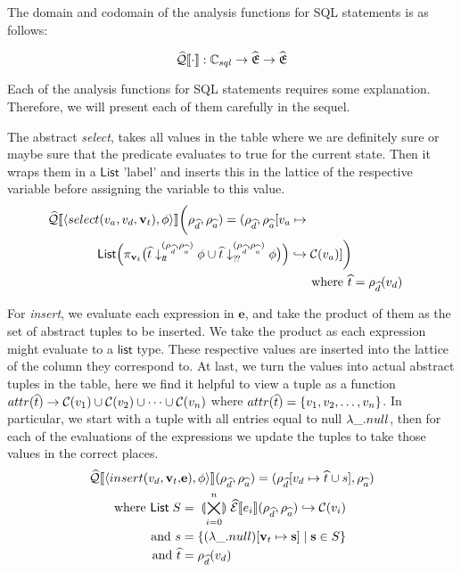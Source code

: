 The domain and codomain of the analysis functions for SQL statements is as follows:

\begin{equation}
    \widehat{\mathcal{Q}}\llbracket \cdot \rrbracket : \mathbb{C}_{sql} \rightarrow \widehat{\mathfrak{E}} \rightarrow \widehat{\mathfrak{E}}
\end{equation}

Each of the analysis functions for SQL statements requires some explanation.
Therefore, we will present each of them carefully in the sequel.

The abstract \textit{select}, takes all values in the table where we are definitely sure or maybe sure that the predicate evaluates to true for the current state.
Then it wraps them in a $\mathsf{List}$ 'label' and inserts this in the lattice of the respective variable before assigning the variable to this value.
\begin{align}
\begin{split}
    \widehat{\mathcal{Q}}\llbracket \langle select(v_a, v_d, \mathbf{v}_t), \phi \rangle \rrbracket\biggl(\rho_{\widehat{d}}, \rho_{\widehat{a}})
    &= (\rho_{\widehat{d}}, \rho_{\widehat{a}}[v_a \mapsto \\
    \mathsf{List} \Bigl( \pi_{\mathbf{v}_t} \bigl(\widehat{t} \downarrow_{t\!t}^{(\rho_{\widehat{d}}, \rho_{\widehat{a}})} \phi \cup \widehat{t} &\downarrow_{?\!?}^{(\rho_{\widehat{d}}, \rho_{\widehat{a}})} \phi \bigr) \Bigr) \hookrightarrow \mathcal{C}(v_a) ]\biggr)
\end{split}\\
    \text{where } \widehat{t}&=\rho_{\widehat{d}}(v_d)
\end{align}

For \textit{insert}, we evaluate each expression in $\mathbf{e}$, and take the product of them as the set of abstract tuples to be inserted.
We take the product as each expression might evaluate to a $\mathsf{list}$ type.
These respective values are inserted into the lattice of the column they correspond to.
At last, we turn the values into actual abstract tuples in the table, here we find it helpful to view a tuple as a function $attr(\widehat{t}) \rightarrow \mathcal{C}(v_1) \cup \mathcal{C}(v_2) \cup \dots \cup \mathcal{C}(v_n)$ where $attr(\widehat{t}) = \{v_1, v_2, \dots, v_n\}$.
In particular, we start with a tuple with all entries equal to null $\lambda\_.null$, then for each of the evaluations of the expressions we update the tuples to take those values in the correct places.
\begin{align}
    \widehat{\mathcal{Q}}\llbracket \langle insert(v_d, \mathbf{v}_t, &\mathbf{e}), \phi \rangle \rrbracket(\rho_{\widehat{d}}, \rho_{\widehat{a}}) = (\rho_{\widehat{d}}[v_d\mapsto \widehat{t}\cup s], \rho_{\widehat{a}}) \\
    \text{where } \mathsf{List} \; S &= \;\llparenthesis\bigtimes_{i = 0}^{n}\rrparenthesis\; \widehat{\mathcal{E}}\llbracket e_i \rrbracket(\rho_{\widehat{d}}, \rho_{\widehat{a}}) \hookrightarrow \mathcal{C}(v_i) \\
    \text{and } s &= \left\{ (\lambda\_.null)[\mathbf{v}_t \mapsto \mathbf{s}] \;\middle|\; \mathbf{s} \in S\right\} \\
    \text{and } \widehat{t}&=\rho_{\widehat{d}}(v_d)
\end{align}

